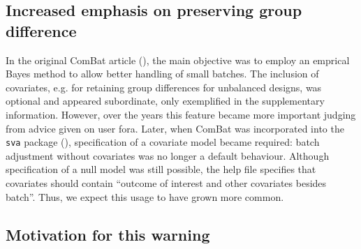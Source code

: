 \documentclass{bio}
\begin{document}
\subsection{Increased emphasis on preserving group difference}

In the original ComBat article (\citealp{Johnson2007}), the main objective was to employ an emprical Bayes method to allow better handling of small batches. The inclusion of covariates, e.g. for retaining group differences for unbalanced designs, was optional and appeared subordinate, only exemplified in the supplementary information. However, over the years this feature became more important judging from advice given on user fora.
Later, when ComBat was incorporated into the \texttt{sva} package (\citealp{Leek2012}), specification of a covariate model became required: batch adjustment without covariates was no longer a default behaviour. Although specification of a null model was still possible, the help file specifies that covariates should contain ``outcome of interest and other covariates besides batch''. Thus, we expect this usage to have grown more common.

\subsection{Motivation for this warning}
\end{document}
